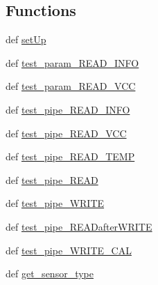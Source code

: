\subsection*{Functions}
\begin{DoxyCompactItemize}
\item 
def \hyperlink{namespacetest_ab4d49aff0f528d5af5e22c8fcdbf12df}{set\-Up}
\item 
def \hyperlink{namespacetest_a5ed64defd9aba0e1f1609e24ee2c52bf}{test\-\_\-param\-\_\-\-R\-E\-A\-D\-\_\-\-I\-N\-F\-O}
\item 
def \hyperlink{namespacetest_af586e1f084e70d40b083d474abdd02ed}{test\-\_\-param\-\_\-\-R\-E\-A\-D\-\_\-\-V\-C\-C}
\item 
def \hyperlink{namespacetest_a3d23a6c3034532a5d3dba851ff48c7d9}{test\-\_\-pipe\-\_\-\-R\-E\-A\-D\-\_\-\-I\-N\-F\-O}
\item 
def \hyperlink{namespacetest_a78b90a6b2aee85e91e4b604dec619ad0}{test\-\_\-pipe\-\_\-\-R\-E\-A\-D\-\_\-\-V\-C\-C}
\item 
def \hyperlink{namespacetest_aeed0f3e6739cf2d5f43519442ba49fa1}{test\-\_\-pipe\-\_\-\-R\-E\-A\-D\-\_\-\-T\-E\-M\-P}
\item 
def \hyperlink{namespacetest_a6914c11d0992466640f9f1efeeb474dd}{test\-\_\-pipe\-\_\-\-R\-E\-A\-D}
\item 
def \hyperlink{namespacetest_ae92dfa92b013577a1f3cde7ed5becf71}{test\-\_\-pipe\-\_\-\-W\-R\-I\-T\-E}
\item 
def \hyperlink{namespacetest_a7803997ab7cd73274fbd69f3df3da653}{test\-\_\-pipe\-\_\-\-R\-E\-A\-Dafter\-W\-R\-I\-T\-E}
\item 
def \hyperlink{namespacetest_abb66dbb476751615efddf34a9a765af9}{test\-\_\-pipe\-\_\-\-W\-R\-I\-T\-E\-\_\-\-C\-A\-L}
\item 
def \hyperlink{namespacetest_a723a5231a237d79a789f4ad357e7d6e0}{get\-\_\-sensor\-\_\-type}
\end{DoxyCompactItemize}
